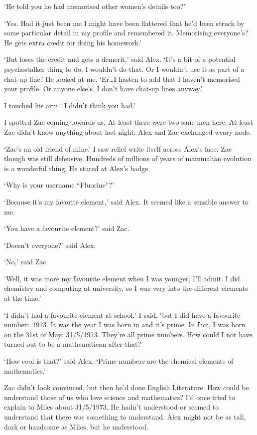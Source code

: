 `He told you he had memorised other women's details too?'

`Yes. Had it just been me I might have been flattered that he'd been
struck by some particular detail in my profile and remembered it.
Memorising everyone's? He gets extra credit for doing his homework.'

`But loses the credit and gets a demerit,' said Alex. `It's a bit of
a potential psychostalker thing to do. I wouldn't do that. Or I
wouldn't use it as part of a chat-up line.' He looked at me.
`Er\dots I hasten to add that I haven't memorised your profile. Or
anyone else's. I don't have chat-up lines anyway.'

I touched his arm. `I didn't think you had.'

I spotted Zac coming towards us. At least there were two sane men
here. At least Zac didn't know anything about last night. Alex and
Zac exchanged weary nods.

`Zac's an old friend of mine.' I saw relief write itself across
Alex's face. Zac though was still defensive. Hundreds of millions of
years of mammalian evolution is a wonderful thing. He stared at
Alex's badge.

`Why is your username ``Fluorine''?'

`Because it's my favorite element,' said Alex. It seemed like a
sensible answer to me.

`You have a favourite element?' said Zac.

`Doesn't everyone?' said Alex.

`No,' said Zac.

`Well, it was more my favourite element when I was younger, I'll
admit. I did chemistry and computing at university, so I was very into the different
elements at the time.'

`I didn't had a favourite element at school,' I said, `but I did
have a favourite number:~1973. It was the year I was born in and
it's prime. In fact, I was born on the 31st of May: 31/5/1973.
They're all prime numbers. How could I not have turned out to be a
mathematican after that?'

`How cool is that?' said Alex. `Prime numbers are the chemical
elements of mathematics.'

Zac didn't look convinced, but then he'd done English Literature.
How could be understand those of us who love science and
mathematics? I'd once tried to explain to Miles about 31/5/1973. He
hadn't understood or seemed to understand that there was something
to understand. Alex might not be as tall, dark or handsome as Miles,
but he understood.

